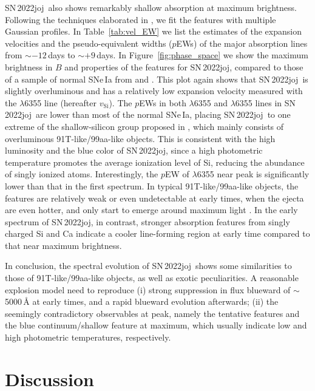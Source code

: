 \documentclass[twocolumn]{aastex631}
\newcommand{\sn}{SN\,2022joj}
\begin{document}
\begin{CJK*}{UTF8}{gbsn}
\sn\ also shows remarkably shallow  absorption at maximum brightness. Following the techniques elaborated in \citet{Liu_20jgb_2023}, we fit the  features with multiple Gaussian profiles. In Table~\ref{tab:vel_EW} we list the estimates of the expansion velocities and the pseudo-equivalent widths ($p$EWs) of the major absorption lines from $\sim$$-12$\,days to $\sim$$+9$\,days. In Figure~\ref{fig:phase_space} we show the maximum brightness in $B$ and properties of the  features for \sn, compared to those of a sample of normal SNe\,Ia from \citet{Zheng_2018} and \citet{Burrow_2020}. This plot again shows that \sn\ is slightly overluminous and has a relatively low expansion velocity measured with the  $\lambda$6355 line (hereafter $v_\mathrm{Si}$). The $p$EWs in both  $\lambda$6355 and  $\lambda$6355 lines in \sn\ are lower than most of the normal SNe\,Ia, placing \sn\ to one extreme of the shallow-silicon group proposed in \citet{Branch_2006}, which mainly consists of overluminous 91T-like/99aa-like objects. This is consistent with the high luminosity and the blue color of \sn, since a high photometric temperature promotes the average ionization level of Si, reducing the abundance of singly ionized atoms. Interestingly, the $p$EW of  $\lambda$6355 near peak is significantly lower than that in the first spectrum. In typical 91T-like/99aa-like objects, the  features are relatively weak or even undetectable at early times, when the ejecta are even hotter, and only start to emerge around maximum light \citep{Filippenko_91T_1992}. In the early spectrum of \sn, in contrast, stronger absorption features from singly charged Si and Ca indicate a cooler line-forming region at early time compared to that near maximum brightness. 

In conclusion, the spectral evolution of \sn\ shows some similarities to those of 91T-like/99aa-like objects, as well as exotic peculiarities. A reasonable explosion model need to reproduce (i) strong suppression in flux blueward of $\sim$5000\,\r{A} at early times, and a rapid blueward evolution afterwards; (ii) the seemingly contradictory observables at peak, namely the tentative  features and the blue continuum/shallow  feature at maximum, which usually indicate low and high photometric temperatures, respectively.

\section{Discussion} \label{sec:discussion}

\end{CJK*}
\end{document}
